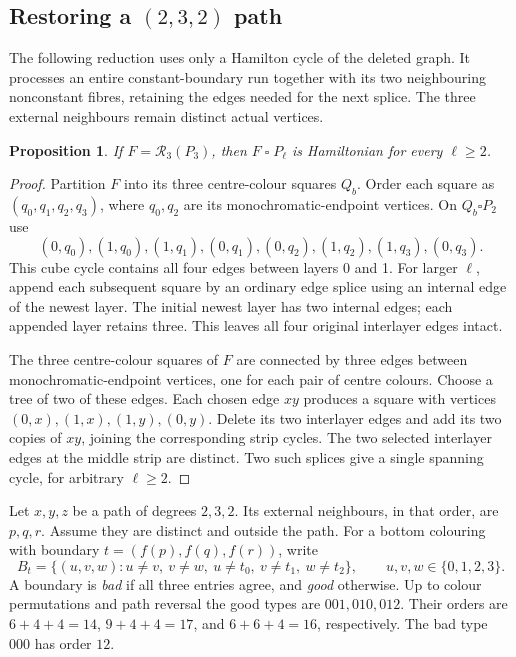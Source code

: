 \documentclass[11pt]{article}
\newtheorem{proposition}[theorem]{Proposition}
\theoremstyle{remark}
\newcommand{\R}{\mathcal R}
\numberwithin{equation}{section}
\numberwithin{table}{section}
\begin{document}
\subsection{\texorpdfstring{Restoring a $(2,3,2)$ path}{Restoring a (2,3,2) path}}
The following reduction uses only a Hamilton cycle of the deleted graph.
It processes an entire constant-boundary run together with its two
neighbouring nonconstant fibres, retaining the edges needed for the next
splice.  The three external neighbours remain distinct actual vertices.
\begin{proposition}\label{prop:badrun}
If $F=\R_3(P_3)$, then $F\mathbin{\square}P_\ell$ is Hamiltonian
for every $\ell\ge2$.
\end{proposition}
\begin{proof}
Partition $F$ into its three centre-colour squares $Q_b$.
Order each square as $(q_0,q_1,q_2,q_3)$, where $q_0,q_2$ are
its monochromatic-endpoint vertices. On $Q_b\square P_2$ use
\[
 (0,q_0),(1,q_0),(1,q_1),(0,q_1),
 (0,q_2),(1,q_2),(1,q_3),(0,q_3).
\]
This cube cycle contains all four edges between layers 0 and 1.
For larger $\ell$, append each subsequent square by an ordinary
edge splice using an internal edge of the newest layer. The initial
newest layer has two internal edges; each appended layer retains
three. This leaves all four original interlayer edges intact.

The three centre-colour squares of $F$ are connected by three edges
between monochromatic-endpoint vertices, one for each pair of
centre colours. Choose a tree of two of these edges. Each chosen
edge $xy$ produces a square with vertices $(0,x),(1,x),(1,y),(0,y)$.
Delete its two interlayer edges and add its two copies of $xy$,
joining the corresponding strip cycles. The two selected interlayer
edges at the middle strip are distinct. Two such splices give a
single spanning cycle, for arbitrary $\ell\ge2$.
\end{proof}

Let $x,y,z$ be a path of degrees $2,3,2$.  Its external neighbours, in
that order, are $p,q,r$.  Assume they are distinct and outside the path.
For a bottom colouring with boundary $t=(f(p),f(q),f(r))$, write
\[
 B_t=\{(u,v,w):u\ne v,\ v\ne w,\ u\ne t_0,\ v\ne t_1,
                  \ w\ne t_2\},\qquad u,v,w\in\{0,1,2,3\}.
\]
A boundary is \emph{bad} if all three entries agree, and \emph{good}
otherwise. Up to colour permutations and path reversal the good types
are $001,010,012$. Their orders are $6+4+4=14$, $9+4+4=17$, and
$6+6+4=16$, respectively. The bad type $000$ has order $12$.
\end{document}
